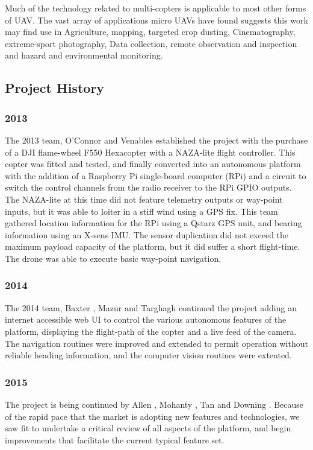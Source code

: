 \documentclass[a4paper, 11pt, titlepage]{article}
\begin{document}
    Much of the technology related to multi-copters is applicable to most other forms of UAV.  The vast array of applications micro UAVs have found suggests this work may find use in Agriculture, mapping, targeted crop dusting, Cinematography, extreme-sport photography, Data collection, remote observation and inspection and hazard and environmental monitoring.


  \subsection{Project History}
    \subsubsection{2013}
    The 2013 team, O'Connor \cite{OConnor} and Venables \cite{Venables} established the project with the purchase of a DJI flame-wheel F550 Hexacopter with a NAZA-lite flight controller.  This copter was fitted and tested, and finally converted into an autonomous platform with the addition of a Raspberry Pi single-board computer (RPi) and a circuit to switch the control channels from the radio receiver to the RPi GPIO outputs.
    The NAZA-lite at this time did not feature telemetry outputs or way-point inputs, but it was able to loiter in a stiff wind using a GPS fix.
    This team gathered location information for the RPi using a Qstarz GPS unit, and bearing information using an X-sens IMU.  The sensor duplication did not exceed the maximum payload capacity of the platform, but it did suffer a short flight-time.
    The drone was able to execute basic way-point navigation.
    \subsubsection{2014}

    The 2014 team, Baxter \cite{Baxter}, Mazur \cite{Mazur} and Targhagh \cite{Targhagh} continued the project adding an internet accessible web UI to control the various autonomous features of the platform, displaying the flight-path of the copter and a live feed of the camera.
    The navigation routines were improved and extended to permit operation without reliable heading information, and the computer vision routines were extented.

    \subsubsection{2015}
    The project is being continued by Allen \cite{Allen}, Mohanty \cite{Mohanty}, Tan \cite{Tan} and Downing \cite{Downing}.
    Because of the rapid pace that the market is adopting new features and technologies, we saw fit to undertake a critical review of all aspects of the platform, and begin improvements that facilitate the current typical feature set.
\end{document}
